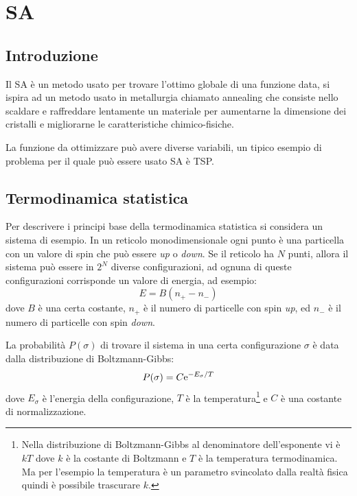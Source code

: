 \chapter{\acf{SA}}
\section{Introduzione}
Il \ac{SA} \`e un metodo usato per trovare l'ottimo globale di una
funzione data, si ispira ad un metodo usato in metallurgia chiamato
annealing che consiste nello scaldare e raffreddare lentamente un
materiale per aumentarne la dimensione dei cristalli e migliorarne le
caratteristiche chimico-fisiche.

La funzione da ottimizzare pu\`o avere diverse variabili, un tipico
esempio di problema per il quale pu\`o essere usato \ac{SA} \`e
\ac{TSP}.

\section{Termodinamica statistica}
Per descrivere i principi base della termodinamica statistica si
considera un sistema di esempio. In un reticolo monodimensionale ogni
punto \`e una particella con un valore di spin che pu\`o essere
\emph{up} o
\emph{down}. Se il reticolo ha $N$ punti, allora il sistema pu\`o
essere in $2^N$ diverse configurazioni, ad ognuna di queste
configurazioni corrisponde un valore di energia, ad esempio:
\begin{equation*}
  E=B(n_+-n_-)
\end{equation*}
dove $B$ \`e una certa costante, $n_+$ \`e il numero di particelle con
spin 
\emph{up}, ed $n_-$ \`e il numero di particelle con spin \emph{down}.

La probabilit\`a $P(\sigma)$ di trovare il sistema in una certa
configurazione
$\sigma$ \`e data dalla distribuzione di Boltzmann-Gibbs:
\begin{equation}\label{eq:distBoltz}
  P(\sigma) = C \mathrm{e}^{-E_\sigma/T}
\end{equation}
dove $E_\sigma$ \`e l'energia della configurazione, $T$ \`e la
temperatura\footnote{Nella distribuzione di Boltzmann-Gibbs al
  denominatore dell'esponente vi \`e $kT$ dove $k$ \`e la costante di
  Boltzmann e $T$ \`e la temperatura termodinamica. Ma per l'esempio
  la temperatura \`e un parametro svincolato dalla realt\`a fisica
  quindi \`e possibile trascurare $k$.} e $C$ \`e una costante di
normalizzazione.

